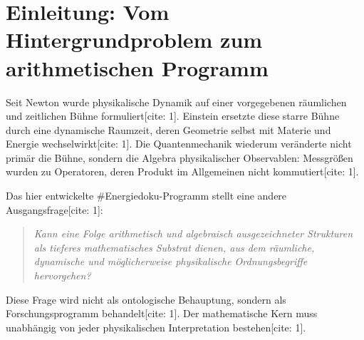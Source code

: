 \documentclass[11pt,a4paper]{article}
\newcommand{\OO}{\mathbb{O}}
\newcommand{\Aut}{\operatorname{Aut}}
\begin{document}
\begin{abstract}
		Als zweite algebraische Ebene werden die Oktonionen eingeführt[cite: 1]. Während Nichtkommutativität durch den Kommutator gemessen wird, quantifiziert der Assoziator
		\[
		[x,y,z]=(xy)z-x(yz)
		\]
		den Verlust der Assoziativität[cite: 1]. Artins Satz garantiert die Assoziativität jeder von zwei Elementen erzeugten Unteralgebra; genuine Nichtassoziativität ist deshalb erstmals durch eine dreistellige Observable detektierbar[cite: 1]. Die Assoziator-Norm ist unter $G_2=\Aut(\OO)$ invariant und liefert eine natürliche mathematische Kandidatin für eine ,,Unschärfe zweiter Ordnung''[cite: 1]. Eine Verbindung zu fundamentalen Eichwechselwirkungen, insbesondere zur starken Wechselwirkung, wird ausdrücklich nicht behauptet, sondern als offene physikalische Hypothese formuliert[cite: 1].
		
		Der Artikel verbindet diese Konstruktion historisch mit Euler, Hamilton, Graves/Cayley, Hurwitz und der nichtkommutativen Operatoralgebra der Quantenmechanik und schließt mit einer dreistufigen Claim-Wall[cite: 1]:
		\[
		\texttt{PROVED}\;\longrightarrow\;\texttt{TESTABLE}\;\longrightarrow\;\texttt{PHYSICAL HYPOTHESIS}.
		\]
	\end{abstract}
	
	\newpage
	\tableofcontents
	\vspace{1cm}
	
	\section{Einleitung: Vom Hintergrundproblem zum arithmetischen Programm}
	Seit Newton wurde physikalische Dynamik auf einer vorgegebenen räumlichen und zeitlichen Bühne formuliert[cite: 1]. Einstein ersetzte diese starre Bühne durch eine dynamische Raumzeit, deren Geometrie selbst mit Materie und Energie wechselwirkt[cite: 1]. Die Quantenmechanik wiederum veränderte nicht primär die Bühne, sondern die Algebra physikalischer Observablen: Messgrößen wurden zu Operatoren, deren Produkt im Allgemeinen nicht kommutiert[cite: 1].
	
	Das hier entwickelte \#Energiedoku-Programm stellt eine andere Ausgangsfrage[cite: 1]:
	\begin{quote}
		\emph{Kann eine Folge arithmetisch und algebraisch ausgezeichneter Strukturen als tieferes mathematisches Substrat dienen, aus dem räumliche, dynamische und möglicherweise physikalische Ordnungsbegriffe hervorgehen?}
	\end{quote}
	Diese Frage wird nicht als ontologische Behauptung, sondern als Forschungsprogramm behandelt[cite: 1]. Der mathematische Kern muss unabhängig von jeder physikalischen Interpretation bestehen[cite: 1].
	
\end{document}
